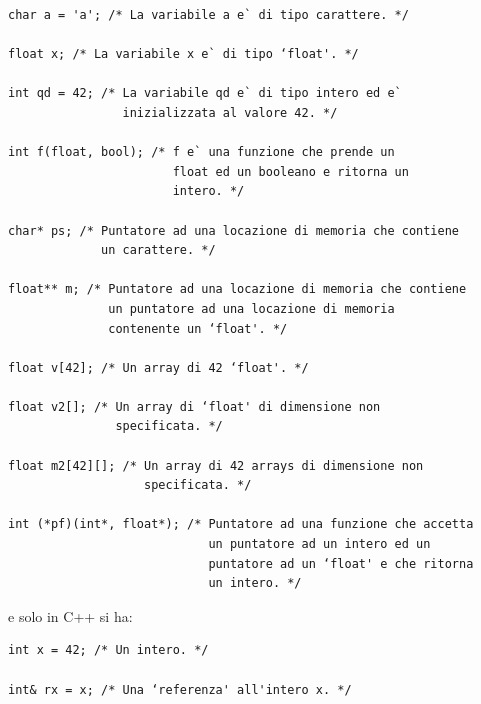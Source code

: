 \documentclass[a4paper,12pt, oneside]{book}
\begin{document}
\begin{verbatim}
char a = 'a'; /* La variabile a e` di tipo carattere. */

float x; /* La variabile x e` di tipo ‘float'. */

int qd = 42; /* La variabile qd e` di tipo intero ed e`
                inizializzata al valore 42. */

int f(float, bool); /* f e` una funzione che prende un
                       float ed un booleano e ritorna un
                       intero. */
                       
char* ps; /* Puntatore ad una locazione di memoria che contiene
             un carattere. */

float** m; /* Puntatore ad una locazione di memoria che contiene
              un puntatore ad una locazione di memoria
              contenente un ‘float'. */

float v[42]; /* Un array di 42 ‘float'. */

float v2[]; /* Un array di ‘float' di dimensione non
               specificata. */
               
float m2[42][]; /* Un array di 42 arrays di dimensione non
                   specificata. */

int (*pf)(int*, float*); /* Puntatore ad una funzione che accetta
                            un puntatore ad un intero ed un
                            puntatore ad un ‘float' e che ritorna
                            un intero. */
\end{verbatim}
e solo in C++ si ha:
\begin{verbatim}
int x = 42; /* Un intero. */

int& rx = x; /* Una ‘referenza' all'intero x. */
\end{verbatim}
\end{document}
